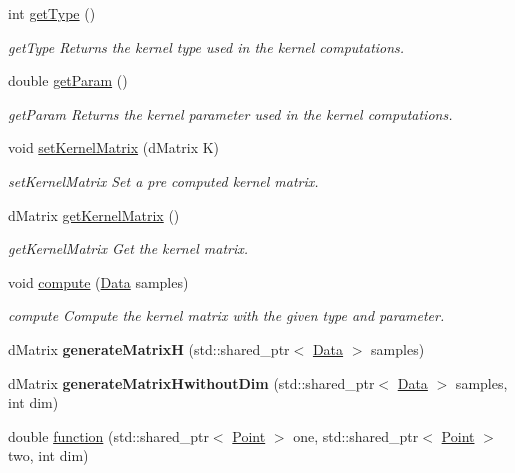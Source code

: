 \begin{DoxyCompactItemize}
int \hyperlink{class_kernel_a5a2cb0fce0eda6c67a2325f6c8958da8}{get\+Type} ()
\begin{DoxyCompactList}\small\item\em get\+Type Returns the kernel type used in the kernel computations. \end{DoxyCompactList}\item 
double \hyperlink{class_kernel_a838e2cc5018fa702e59c52a3bf8ef813}{get\+Param} ()
\begin{DoxyCompactList}\small\item\em get\+Param Returns the kernel parameter used in the kernel computations. \end{DoxyCompactList}\item 
void \hyperlink{class_kernel_a3801cee0d86f25f1500d202f43a84b65}{set\+Kernel\+Matrix} (d\+Matrix K)
\begin{DoxyCompactList}\small\item\em set\+Kernel\+Matrix Set a pre computed kernel matrix. \end{DoxyCompactList}\item 
d\+Matrix \hyperlink{class_kernel_a5e398c63fee5f0e30b6dfb735c75e41a}{get\+Kernel\+Matrix} ()
\begin{DoxyCompactList}\small\item\em get\+Kernel\+Matrix Get the kernel matrix. \end{DoxyCompactList}\item 
void \hyperlink{class_kernel_a5dfd3a6b535745eadd9e17dc086d87c6}{compute} (\hyperlink{class_data}{Data} samples)
\begin{DoxyCompactList}\small\item\em compute Compute the kernel matrix with the given type and parameter. \end{DoxyCompactList}\item 
\mbox{\label{class_kernel_a0980c9b8d0b7bb2858c00c207ba42e02}} 
d\+Matrix {\bfseries generate\+MatrixH} (std\+::shared\+\_\+ptr$<$ \hyperlink{class_data}{Data} $>$ samples)
\item 
\mbox{\label{class_kernel_a2cd7254deccfaf4c60e4551b9c8aef25}} 
d\+Matrix {\bfseries generate\+Matrix\+Hwithout\+Dim} (std\+::shared\+\_\+ptr$<$ \hyperlink{class_data}{Data} $>$ samples, int dim)
\item 
double \hyperlink{class_kernel_aa07703cd76124769325d942582b16b5f}{function} (std\+::shared\+\_\+ptr$<$ \hyperlink{class_point}{Point} $>$ one, std\+::shared\+\_\+ptr$<$ \hyperlink{class_point}{Point} $>$ two, int dim)

\end{DoxyCompactItemize}
